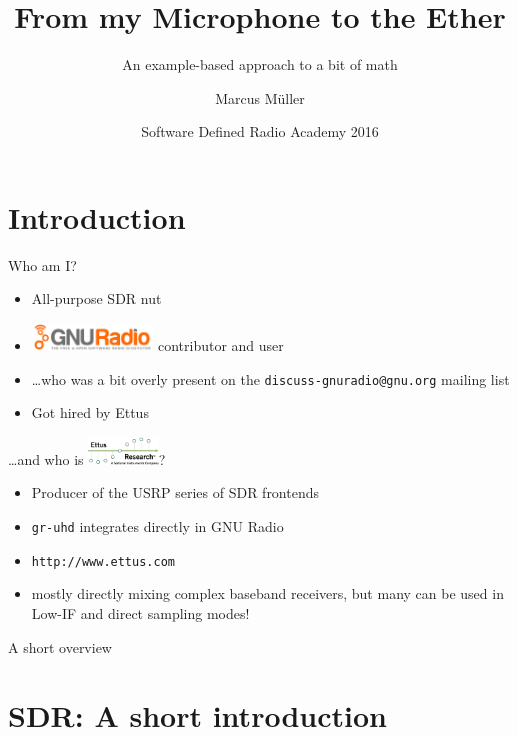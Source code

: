 \documentclass{beamer}
\title[From my Microphone to the Ether -- an Introduction to SDR]{From my Microphone to the Ether}
\subtitle{An example-based approach to a bit of math}
\author{Marcus Müller}
\date{Software Defined Radio Academy 2016}
\begin{document}
\frame{\titlepage}


\section{Introduction}

\begin{frame}{Who am I?}
  \begin{itemize}
    \item All-purpose SDR nut
    \item \includegraphics[height=2em]{gnuradio_logo} contributor and user
    \item \ldots who was a bit overly present on the \texttt{discuss-gnuradio@gnu.org} mailing list
    \item Got hired by Ettus
  \end{itemize}
  \pause
  \ldots and who is \includegraphics[height=2em]{ettus_logo}?
  \begin{itemize}
    \item Producer of the USRP series of SDR frontends
    \item \texttt{gr-uhd} integrates directly in GNU Radio
    \item \texttt{http://www.ettus.com}
    \item mostly directly mixing complex baseband receivers, but many can be used in Low-IF and direct sampling modes!
  \end{itemize}
\end{frame}

\begin{frame}{A short overview}
  \tableofcontents{}
\end{frame}


\section{SDR: A short introduction}
\end{document}
